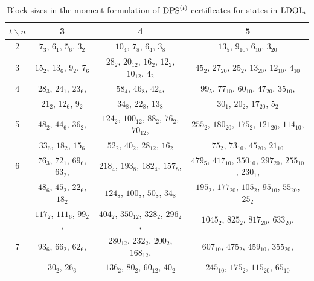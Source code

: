 \documentclass[11pt]{article}
\newcommand{\LDOI}{\text{\rm LDOI}}
\newcommand{\DPS}{\text{\rm DPS}}
\theoremstyle{plain}
\begin{document}
\begin{table}[h!]
    \centering
    \begin{tabular}{c|c|c|c}
         $t\backslash n$ & 3 & 4 & 5 \\ \hline
         2 & $7_{3}$, $6_{1}$, $5_{6}$, $3_{2}$ & $10_{4}$, $7_{8}$, $6_{4}$, $3_{8}$ & $13_{5}$, $9_{10}$, $6_{10}$, $3_{20}$ \\ \hline
         3 & $15_{2}$, $13_{6}$, $9_{2}$, $7_{6}$ & $28_{2}$, $20_{12}$, $16_{2}$, $12_{2}$, $10_{12}$, $4_{2}$ & $45_{2}$, $27_{20}$, $25_{2}$, $13_{20}$, $12_{10}$, $4_{10}$ \\ \hline
         4 & $28_{3}$, $24_{1}$, $23_{6}$,  & $58_{4}$, $46_{8}$, $42_{4}$, & $99_{5}$, $77_{10}$, $60_{10}$, $47_{20}$, $35_{10}$, \\
         & $21_{2}$, $12_{6}$, $9_{2}$ & $34_{8}$, $22_{8}$, $13_{8}$ &  $30_{1}$, $20_{2}$, $17_{20}$, $5_{2}$\\\hline
         5& $48_2$, $44_6$, $36_2$, & $124_2$, $100_{12}$, $88_2$, $76_2$, $70_{12}$, & $255_2$, $180_{20}$, $175_2$, $121_{20}$, $114_{10}$, \\
          & $33_6$, $18_2$, $15_6$ & $52_2$, $40_2$, $28_{12}$, $16_2$ & $75_2$, $73_{10}$, $45_{20}$, $21_{10}$\\\hline
        6& $76_{3}$, $72_{1}$, $69_{6}$, $63_{2}$, & $218_{4}$, $193_{8}$, $182_{4}$, $157_{8}$, & $479_{5}$, $417_{10}$, $350_{10}$, $297_{20}$, $255_{10}$, $230_{1}$, \\
        & $48_{6}$, $45_{2}$, $22_{6}$, $18_{2}$ & $124_{8}$, $100_{8}$, $50_{8}$, $34_{8}$ & $195_{2}$, $177_{20}$, $105_{2}$, $95_{10}$, $55_{20}$, $25_{2}$\\\hline
         & $117_{2}$, $111_{6}$, $99_{2}$, & $404_{2}$, $350_{12}$, $328_{2}$, $296_{2}$, & $1045_{2}$, $825_{2}$, $817_{20}$, $633_{20}$, \\
        7 & $93_{6}$, $66_{2}$, $62_{6}$,& $280_{12}$, $232_{2}$, $200_{2}$, $168_{12}$, & $607_{10}$, $475_{2}$, $459_{10}$, $355_{20}$, \\
         &  $30_{2}$, $26_{6}$ & $136_{2}$, $80_{2}$, $60_{12}$, $40_{2}$ & $245_{10}$, $175_{2}$, $115_{20}$, $65_{10}$
    \end{tabular}
    \caption{Block sizes in the moment formulation of $\DPS^{(t)}$-certificates for states in $\LDOI_n$}
    \label{tab:LDOIBlockSize}
\end{table}
\end{document}
